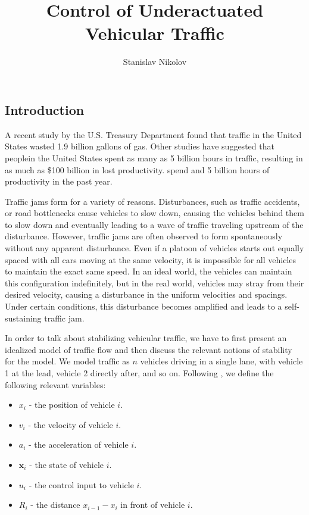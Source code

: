 \documentclass[11pt]{article}
\title{\bf Control of Underactuated Vehicular Traffic}
\author{Stanislav Nikolov}
\newcommand{\mb}{\mathbf}
\begin{document}
\maketitle

\begin{multicols}{2}

\section{Introduction}
A recent study by the U.S. Treasury Department found that traffic in the United States wasted 1.9 billion gallons of gas. Other studies have suggested that peoplein the United States spent as many as 5 billion hours in traffic, resulting in as much as \$100 billion in lost productivity.  spend and 5 billion hours of productivity in the past year.

Traffic jams form for a variety of reasons. Disturbances, such as traffic accidents, or road bottlenecks cause vehicles to slow down, causing the vehicles behind them to slow down and eventually leading to a wave of traffic traveling upstream of the disturbance. However, traffic jams are often observed to form spontaneously without any apparent disturbance. Even if a platoon of vehicles starts out equally spaced with all cars moving at the same velocity, it is impossible for all vehicles to maintain the exact same speed. In an ideal world, the vehicles can maintain this configuration indefinitely, but in the real world, vehicles may stray from their desired velocity, causing a disturbance in the uniform velocities and spacings. Under certain conditions, this disturbance becomes amplified and leads to a self-sustaining traffic jam. %

In order to talk about stabilizing vehicular traffic, we have to first present an idealized model of traffic flow and then discuss the relevant notions of stability for the model. We model traffic as $n$ vehicles driving in a single lane, with vehicle 1 at the lead, vehicle 2 directly after, and so on. Following \cite{Peng}, we define the following relevant variables:

\begin{itemize}
\item $x_i$ - the position of vehicle $i$.
\item $v_i$ - the velocity of vehicle $i$.
\item $a_i$ - the acceleration of vehicle $i$.
\item $\mb x_i$ - the state of vehicle $i$.
\item $u_i$ - the control input to vehicle $i$.
\item $R_i$ - the distance $x_{i-1} - x_i$ in front of vehicle $i$.
\end{itemize}


\end{multicols}
\end{document}
